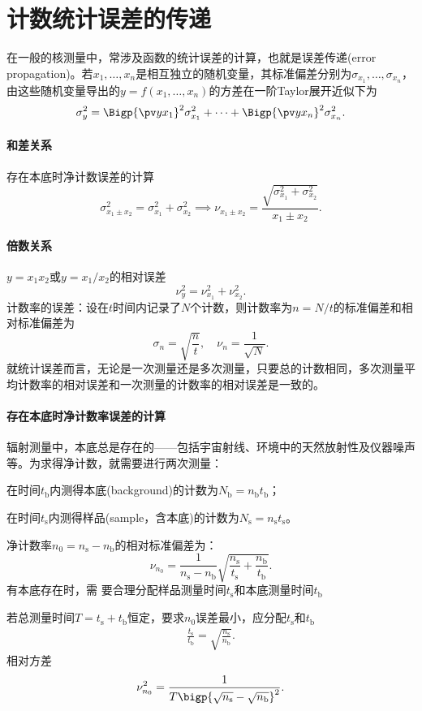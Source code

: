 \section{计数统计误差的传递}

在一般的核测量中，常涉及函数的统计误差的计算，也就是误差传递(error propagation)。若$x_1,\ldots,x_n$是相互独立的随机变量，其标准偏差分别为$\sigma_{x_1},\ldots,\sigma_{x_n}$，由这些随机变量导出的$y=f(x_1,\ldots,x_n)$的方差在一阶Taylor展开近似下为
\[
	\sigma_y^2=\Bigp{\pv y{x_1}}^2\sigma_{x_1}^2+\cdots+\Bigp{\pv y{x_n}}^2\sigma_{x_n}^2.
\]
\paragraph{和差关系}存在本底时净计数误差的计算
\[
	\sigma_{x_1\pm x_2}^2=\sigma_{x_1}^2+\sigma_{x_2}^2\implies\nu_{x_1\pm x_2}=\frac{\sqrt{\sigma_{x_1}^2+\sigma_{x_2}^2}}{x_1\pm x_2}.
\]

\paragraph{倍数关系}$y=x_1x_2$或$y=x_1/x_2$的相对误差
\[
	\nu_y^2=\nu_{x_1}^2+\nu_{x_2}^2.
\]
计数率的误差：设在$t$时间内记录了$N$个计数，则计数率为$n=N/t$的标准偏差和相对标准偏差为
\[
	\sigma_n=\sqrt{\frac nt},\quad\nu_n=\frac1{\sqrt N}.
\]
就统计误差而言，无论是一次测量还是多次测量，只要总的计数相同，多次测量平均计数率的相对误差和一次测量的计数率的相对误差是一致的。
\paragraph{存在本底时净计数率误差的计算}辐射测量中，本底总是存在的——包括宇宙射线、环境中的天然放射性及仪器噪声等。为求得净计数，就需要进行两次测量：
\begin{compactitem}
	\item 在时间$t_\mathrm b$内测得本底(background)的计数为$N_\mathrm b=n_\mathrm bt_\mathrm b$；
	\item 在时间$t_\mathrm s$内测得样品(sample，含本底)的计数为$N_\mathrm s=n_\mathrm st_\mathrm s$。
\end{compactitem}
净计数率$n_0=n_\mathrm s-n_\mathrm b$的相对标准偏差为：
\[
	\nu_{n_0}=\frac1{n_\mathrm s-n_\mathrm b}\sqrt{\frac{n_\mathrm s}{t_\mathrm s}+\frac{n_\mathrm b}{t_\mathrm b}}.
\]
有本底存在时，需 要合理分配样品测量时间$t_\mathrm s$和本底测量时间$t_\mathrm b$

若总测量时间$T=t_\mathrm s+t_\mathrm b$恒定，要求$n_0$误差最小，应分配$t_\mathrm s$和$t_\mathrm b$
\begin{align}
	\frac{t_\mathrm s}{t_\mathrm b}=\sqrt{\frac{n_\mathrm s}{n_\mathrm b}}.
\end{align}
相对方差
\begin{align}
	\nu_{n_0}^2=\frac1{T\bigp{\sqrt{n_\mathrm s}-\sqrt{n_\mathrm b}}^2}.
\end{align}

